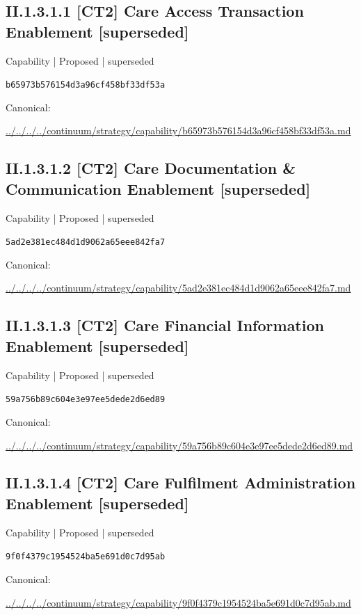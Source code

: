 \documentclass[10pt,a4paper]{article}
\begin{document}
\subsection*{II.1.3.1.1 [CT2] Care Access Transaction Enablement [superseded]}
\label{element-b65973b576154d3a96cf458bf33df53a}
{\small Capability | Proposed | superseded}\par
\texttt{b65973b576154d3a96cf458bf33df53a}\par
Canonical: \par
{\footnotesize\url{../../../../continuum/strategy/capability/b65973b576154d3a96cf458bf33df53a.md}}\par
\subsection*{II.1.3.1.2 [CT2] Care Documentation \& Communication Enablement [superseded]}
\label{element-5ad2e381ec484d1d9062a65eee842fa7}
{\small Capability | Proposed | superseded}\par
\texttt{5ad2e381ec484d1d9062a65eee842fa7}\par
Canonical: \par
{\footnotesize\url{../../../../continuum/strategy/capability/5ad2e381ec484d1d9062a65eee842fa7.md}}\par
\subsection*{II.1.3.1.3 [CT2] Care Financial Information Enablement [superseded]}
\label{element-59a756b89c604e3e97ee5dede2d6ed89}
{\small Capability | Proposed | superseded}\par
\texttt{59a756b89c604e3e97ee5dede2d6ed89}\par
Canonical: \par
{\footnotesize\url{../../../../continuum/strategy/capability/59a756b89c604e3e97ee5dede2d6ed89.md}}\par
\subsection*{II.1.3.1.4 [CT2] Care Fulfilment Administration Enablement [superseded]}
\label{element-9f0f4379c1954524ba5e691d0c7d95ab}
{\small Capability | Proposed | superseded}\par
\texttt{9f0f4379c1954524ba5e691d0c7d95ab}\par
Canonical: \par
{\footnotesize\url{../../../../continuum/strategy/capability/9f0f4379c1954524ba5e691d0c7d95ab.md}}\par
\end{document}

